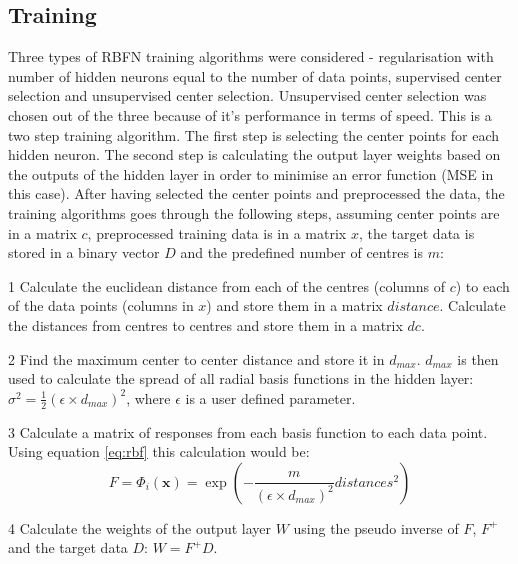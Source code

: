 \documentclass[a4paper, 11pt]{article}
\begin{document}
\subsection{Training}
Three types of RBFN training algorithms were considered - regularisation with number of hidden neurons equal to the number of data points, supervised center selection and unsupervised center selection. Unsupervised center selection was chosen out of the three because of it's performance in terms of speed. This is a two step training algorithm. The first step is selecting the center points for each hidden neuron. The second step is  calculating the output layer weights based on the outputs of the hidden layer in order to minimise an error function (MSE in this case). After having selected the center points and preprocessed the data, the training algorithms goes through the following steps, assuming center points are in a matrix $c$, preprocessed training data is in a matrix $x$, the target data is stored in a binary vector $D$ and the predefined number of centres is $m$:
\begin{list}{•}{•}


\item[1] Calculate the euclidean distance from each of the centres (columns of $c$) to each of the data points (columns in $x$) and store them in a matrix $distance$. Calculate the distances from centres to centres and store them in a matrix $dc$.  
\item[2] Find the maximum center to center distance and store it in $d_{max}$. $d_{max}$ is then used to calculate the spread of all radial basis functions in the hidden layer: $\sigma^2 = \frac{1}{2}(\epsilon \times d_{max})^2$, where $\epsilon$ is a user defined parameter. 
\item[3] Calculate a matrix of responses from each basis function to each data point. Using equation \ref{eq:rbf} this calculation would be:
\begin{equation}
F = \Phi_i(\boldsymbol{x}) = \exp\left(-\frac{m}{(\epsilon \times d_{max})^2} distances^2 \right)  
\end{equation}
\item[4] Calculate the weights of the output layer $W$ using the pseudo inverse of $F$, $F^+$ and the target data $D$: $W= F^+D$.
\end{list}
\end{document}

